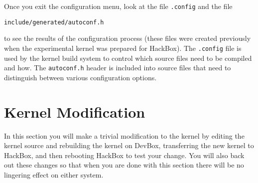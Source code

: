 \documentclass[twocolumn]{article}
\begin{document}
\begin{enumerate}
  Once you exit the configuration menu, look at the file \texttt{.config} and the file
\begin{Verbatim}
include/generated/autoconf.h
\end{Verbatim}
  to see the results of the configuration process (these files were created previously when the
  experimental kernel was prepared for HackBox). The \texttt{.config} file is used by the kernel
  build system to control which source files need to be compiled and how. The
  \texttt{autoconf.h} header is included into source files that need to distinguish between
  various configuration options.
\end{enumerate}

\section{Kernel Modification}

In this section you will make a trivial modification to the kernel by editing the kernel source
and rebuilding the kernel on DevBox, transferring the new kernel to HackBox, and then rebooting
HackBox to test your change. You will also back out these changes so that when you are done with
this section there will be no lingering effect on either system.
\end{document}
